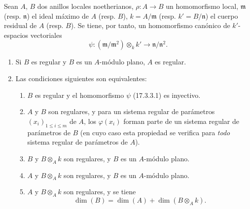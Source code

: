 \begin{proposition}[17.3.3]
\label{0.17.3.3-fr}
Sean $A$, $B$ dos anillos locales noetherianos,
$\rho:A\longrightarrow B$ un homomorfismo local, $\mathfrak{m}$ \textup{(resp.
$\mathfrak{n}$)} el ideal máximo de $A$ \textup{(resp. $B$)},
$k=A/\mathfrak{m}$ \textup{(resp. $k'=B/\mathfrak{n}$)} el cuerpo residual de $A$
\textup{(resp. $B$)}. Se tiene, por tanto, un homomorfismo canónico de $k'$-espacios
vectoriales
\begin{equation}
\label{0.17.3.3.1-fr}
\tag{17.3.3.1}
  \psi:(\mathfrak{m}/\mathfrak{m}^2)\otimes_k k'
  \longrightarrow\mathfrak{n}/\mathfrak{n}^2.
\end{equation}
\begin{enumerate}
  \item[\rm (i)] Si $B$ es regular y $B$ es un $A$-módulo plano, $A$ es
  regular.
  \item[\rm (ii)] Las condiciones siguientes son equivalentes:
  \begin{enumerate}
    \item[\textit{a)}] $B$ es regular y el homomorfismo $\psi$ \textup{(17.3.3.1)} es
    inyectivo.
    \item[\textit{b)}] $A$ y $B$ son regulares, y para un sistema regular de
    parámetros $(x_i)_{1\leq i\leq m}$ de $A$, los $\varphi(x_i)$ forman parte
    de un sistema regular de parámetros de $B$ \textup{(en cuyo caso esta propiedad se
    verifica para \emph{todo} sistema regular de parámetros de $A$)}.
    \item[\textit{c)}] $B$ y $B\otimes_A k$ son regulares, y $B$ es un $A$-módulo
    plano.
    \item[\textit{d)}] $A$ y $B\otimes_A k$ son regulares, y $B$ es un $A$-módulo
    plano.
    \item[\textit{e)}] $A$ y $B\otimes_A k$ son regulares, y se tiene
    \begin{equation}
    \label{0.17.3.3.2-fr}
    \tag{17.3.3.2}
      \dim(B)=\dim(A)+\dim(B\otimes_A k).
    \end{equation}
  \end{enumerate}
\end{enumerate}
\end{proposition}

